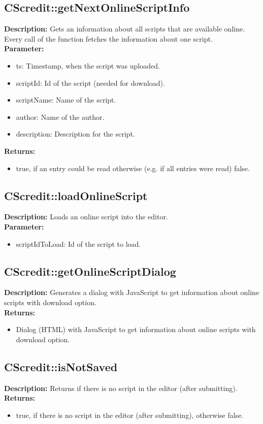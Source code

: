 \subsection{CScredit::getNextOnlineScriptInfo}
\textbf{Description:} Gets an information about all scripts that are available online. Every call of the function fetches the information about one script.\\
\textbf{Parameter:}
\begin{itemize}
\item ts: Timestamp, when the script was uploaded.
\item scriptId: Id of the script (needed for download).
\item scriptName: Name of the script.
\item author: Name of the author.
\item description: Description for the script.
\end{itemize}
\textbf{Returns:}
\begin{itemize}
\item true, if an entry could be read otherwise (e.g. if all entries were read) false.
\end{itemize}

\subsection{CScredit::loadOnlineScript}
\textbf{Description:} Loads an online script into the editor.\\
\textbf{Parameter:}
\begin{itemize}
\item scriptIdToLoad: Id of the script to load.
\end{itemize}

\subsection{CScredit::getOnlineScriptDialog}
\textbf{Description:} Generates a dialog with JavaScript to get information about online scripts with download option.\\
\textbf{Returns:}
\begin{itemize}
\item Dialog (HTML) with JavaScript to get information about online scripts with download option.
\end{itemize}

\subsection{CScredit::isNotSaved}
\textbf{Description:} Returns if there is no script in the editor (after submitting).\\
\textbf{Returns:}
\begin{itemize}
\item true, if there is no script in the editor (after submitting), otherwise false.
\end{itemize}

